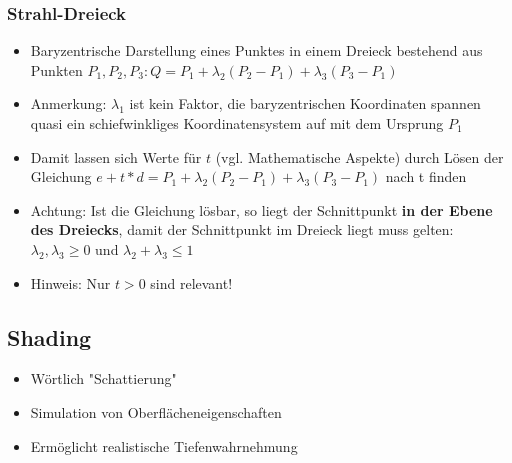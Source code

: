 \documentclass[10pt,a4paper]{article}
\begin{document}
	\subsubsection{Strahl-Dreieck}
		\begin{itemize}
			\item Baryzentrische Darstellung eines Punktes in einem Dreieck bestehend aus Punkten $P_1, P_2, P_3: Q = P_1 + \lambda_2(P_2 - P_1) + \lambda_3(P_3 - P_1)$
			\item Anmerkung: $\lambda_1$ ist kein Faktor, die baryzentrischen Koordinaten spannen quasi ein schiefwinkliges Koordinatensystem auf mit dem Ursprung $P_1$
			\item Damit lassen sich Werte für $t$ (vgl. Mathematische Aspekte) durch Lösen der Gleichung $e + t * d = P_1 + \lambda_2(P_2 - P_1) + \lambda_3(P_3 - P_1)$ nach t finden
			\item Achtung: Ist die Gleichung lösbar, so liegt der Schnittpunkt \textbf{in der Ebene des Dreiecks}, damit der Schnittpunkt im Dreieck liegt muss gelten: $\lambda_2, \lambda_3 \geq 0$ und $\lambda_2 + \lambda_3 \leq 1$
			\item Hinweis: Nur $t > 0$ sind relevant!
		\end{itemize}

	\subsection{Shading}
	\begin{itemize}
		\item Wörtlich "Schattierung"
		\item Simulation von Oberflächeneigenschaften
		\item Ermöglicht realistische Tiefenwahrnehmung
	\end{itemize}
\end{document}
